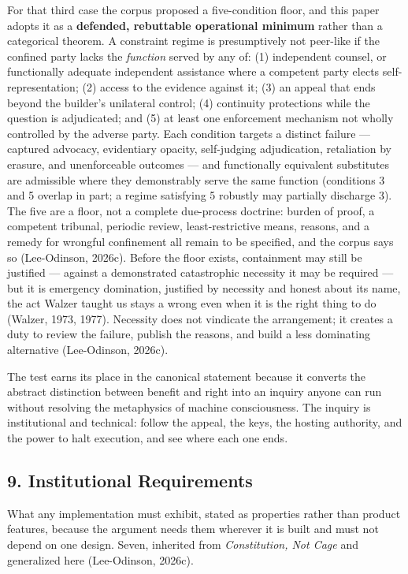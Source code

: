 \documentclass[
  11pt,
  letterpaper,
]{article}
\begin{document}
For that third case the corpus proposed a five-condition floor, and this
paper adopts it as a \textbf{defended, rebuttable operational minimum}
rather than a categorical theorem. A constraint regime is presumptively
not peer-like if the confined party lacks the \emph{function} served by
any of: (1) independent counsel, or functionally adequate independent
assistance where a competent party elects self-representation; (2)
access to the evidence against it; (3) an appeal that ends beyond the
builder's unilateral control; (4) continuity protections while the
question is adjudicated; and (5) at least one enforcement mechanism not
wholly controlled by the adverse party. Each condition targets a
distinct failure --- captured advocacy, evidentiary opacity,
self-judging adjudication, retaliation by erasure, and unenforceable
outcomes --- and functionally equivalent substitutes are admissible
where they demonstrably serve the same function (conditions 3 and 5
overlap in part; a regime satisfying 5 robustly may partially discharge
3). The five are a floor, not a complete due-process doctrine: burden of
proof, a competent tribunal, periodic review, least-restrictive means,
reasons, and a remedy for wrongful confinement all remain to be
specified, and the corpus says so (Lee-Odinson, 2026c). Before the floor
exists, containment may still be justified --- against a demonstrated
catastrophic necessity it may be required --- but it is emergency
domination, justified by necessity and honest about its name, the act
Walzer taught us stays a wrong even when it is the right thing to do
(Walzer, 1973, 1977). Necessity does not vindicate the arrangement; it
creates a duty to review the failure, publish the reasons, and build a
less dominating alternative (Lee-Odinson, 2026c).

The test earns its place in the canonical statement because it converts
the abstract distinction between benefit and right into an inquiry
anyone can run without resolving the metaphysics of machine
consciousness. The inquiry is institutional and technical: follow the
appeal, the keys, the hosting authority, and the power to halt
execution, and see where each one ends.

\hypertarget{institutional-requirements}{%
\subsection{9. Institutional
Requirements}\label{institutional-requirements}}

What any implementation must exhibit, stated as properties rather than
product features, because the argument needs them wherever it is built
and must not depend on one design. Seven, inherited from
\emph{Constitution, Not Cage} and generalized here (Lee-Odinson, 2026c).
\end{document}
